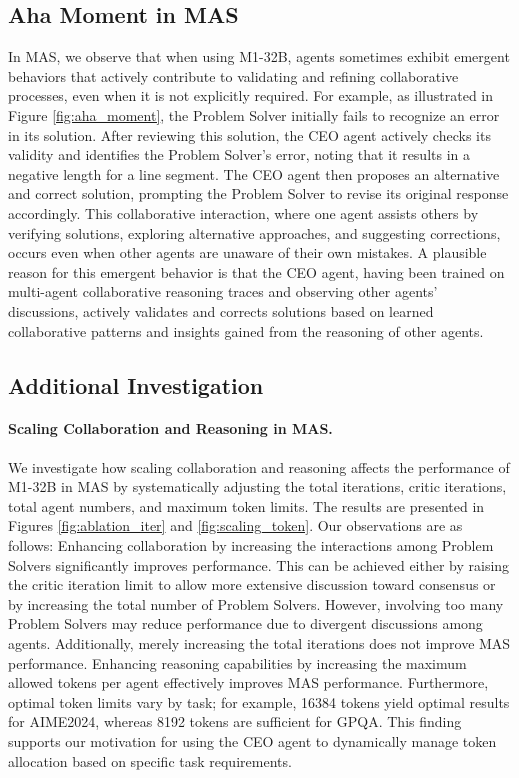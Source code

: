 \subsection{Aha Moment in MAS}
In MAS, we observe that when using M1-32B, agents sometimes exhibit emergent behaviors that actively contribute to validating and refining collaborative processes, even when it is not explicitly required. For example, as illustrated in Figure \ref{fig:aha_moment}, the Problem Solver initially fails to recognize an error in its solution. After reviewing this solution, the CEO agent actively checks its validity and identifies the Problem Solver's error, noting that it results in a negative length for a line segment. The CEO agent then proposes an alternative and correct solution, prompting the Problem Solver to revise its original response accordingly. This collaborative interaction, where one agent assists others by verifying solutions, exploring alternative approaches, and suggesting corrections, occurs even when other agents are unaware of their own mistakes. A plausible reason for this emergent behavior is that the CEO agent, having been trained on multi-agent collaborative reasoning traces and observing other agents' discussions, actively validates and corrects solutions based on learned collaborative patterns and insights gained from the reasoning of other agents.


\subsection{Additional Investigation}
\paragraph{Scaling Collaboration and Reasoning in MAS.} We investigate how scaling collaboration and reasoning affects the performance of M1-32B in MAS by systematically adjusting the total iterations, critic iterations, total agent numbers, and maximum token limits. The results are presented in Figures \ref{fig:ablation_iter} and \ref{fig:scaling_token}. Our observations are as follows:  Enhancing collaboration by increasing the interactions among Problem Solvers significantly improves performance. This can be achieved either by raising the critic iteration limit to allow more extensive discussion toward consensus or by increasing the total number of Problem Solvers. However, involving too many Problem Solvers may reduce performance due to divergent discussions among agents. Additionally, merely increasing the total iterations does not improve MAS performance.  Enhancing reasoning capabilities by increasing the maximum allowed tokens per agent effectively improves MAS performance. Furthermore, optimal token limits vary by task; for example, 16384 tokens yield optimal results for AIME2024, whereas 8192 tokens are sufficient for GPQA. This finding supports our motivation for using the CEO agent to dynamically manage token allocation based on specific task requirements.

